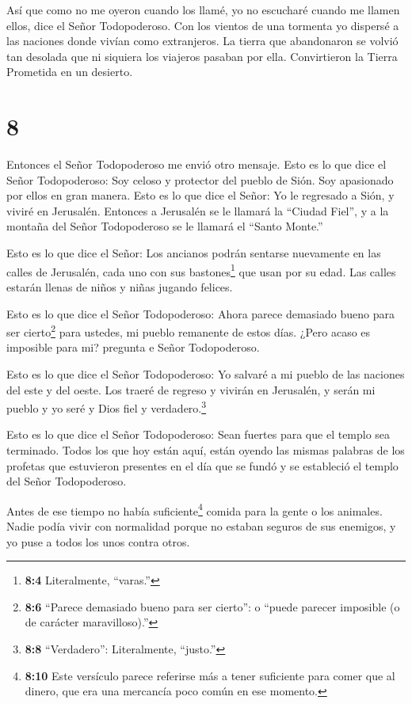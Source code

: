  Así que como no me oyeron cuando los llamé, yo no
escucharé cuando me llamen ellos, dice el Señor Todopoderoso.
 Con los vientos de una tormenta yo dispersé a las naciones
donde vivían como extranjeros. La tierra que abandonaron se volvió tan
desolada que ni siquiera los viajeros pasaban por ella. Convirtieron la
Tierra Prometida en un desierto.

\hypertarget{section-7}{%
\section{8}\label{section-7}}

 Entonces el Señor Todopoderoso me envió otro mensaje.
 Esto es lo que dice el Señor Todopoderoso: Soy celoso y
protector del pueblo de Sión. Soy apasionado por ellos en gran manera.
 Esto es lo que dice el Señor: Yo le regresado a Sión, y
viviré en Jerusalén. Entonces a Jerusalén se le llamará la ``Ciudad
Fiel'', y a la montaña del Señor Todopoderoso se le llamará el ``Santo
Monte.''

 Esto es lo que dice el Señor: Los ancianos podrán sentarse
nuevamente en las calles de Jerusalén, cada uno con sus
bastones\footnote{\textbf{8:4} Literalmente, ``varas.''} que usan por su
edad.  Las calles estarán llenas de niños y niñas jugando
felices.

 Esto es lo que dice el Señor Todopoderoso: Ahora parece
demasiado bueno para ser cierto\footnote{\textbf{8:6} ``Parece demasiado
  bueno para ser cierto'': o ``puede parecer imposible (o de carácter
  maravilloso).''} para ustedes, mi pueblo remanente de estos días.
¿Pero acaso es imposible para mi? pregunta e Señor Todopoderoso.

 Esto es lo que dice el Señor Todopoderoso: Yo salvaré a mi
pueblo de las naciones del este y del oeste.  Los traeré de
regreso y vivirán en Jerusalén, y serán mi pueblo y yo seré y Dios fiel
y verdadero.\footnote{\textbf{8:8} ``Verdadero'': Literalmente,
  ``justo.''}

 Esto es lo que dice el Señor Todopoderoso: Sean fuertes
para que el templo sea terminado. Todos los que hoy están aquí, están
oyendo las mismas palabras de los profetas que estuvieron presentes en
el día que se fundó y se estableció el templo del Señor Todopoderoso.

 Antes de ese tiempo no había suficiente\footnote{\textbf{8:10}
  Este versículo parece referirse más a tener suficiente para comer que
  al dinero, que era una mercancía poco común en ese momento.} comida
para la gente o los animales. Nadie podía vivir con normalidad porque no
estaban seguros de sus enemigos, y yo puse a todos los unos contra
otros.

